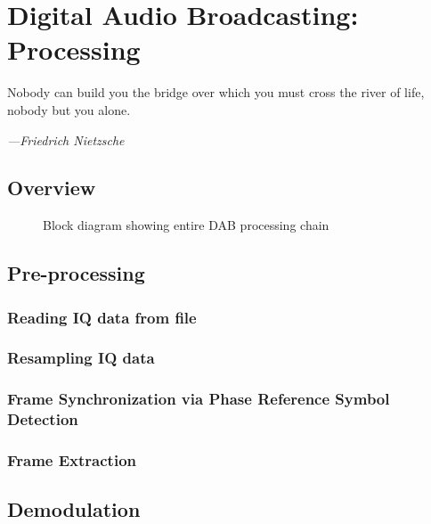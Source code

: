 \documentclass[class=report,11pt,crop=false]{standalone}
\begin{document}
\ifstandalone
\tableofcontents
\fi
\chapter{Digital Audio Broadcasting: Processing}
\epigraph{Nobody can build you the bridge over which you must cross the river of life, nobody but you alone.}%
    {\emph{---Friedrich Nietzsche}}

\section{Overview}

\begin{figure}[htbp]
    \centering
    \def\svgwidth{\linewidth}
    { %
        }
    \caption{Block diagram showing entire DAB processing chain}
    \label{fig:BD_Overview_All}
\end{figure}

\section{Pre-processing \label{sect:dab-proc_preprocessing}}

\subsection{Reading IQ data from file \label{subsect:dab-proc_iq-read}}


\subsection{Resampling IQ data \label{subsect:dab-proc_iq-resample}}


\subsection{Frame Synchronization via Phase Reference Symbol Detection \label{subsect:dab-proc_prs-detect}}


\subsection{Frame Extraction \label{subsect:dab-proc_frame-extract}}



\section{Demodulation \label{sect:dab-proc_demodulate}}
\end{document}
